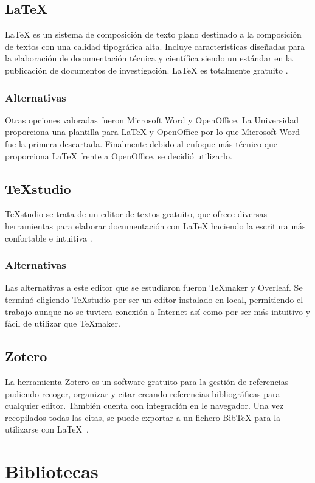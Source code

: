 	\subsection{\LaTeX}\label{LaTex}
\LaTeX{} es un sistema de composición de texto plano destinado a la composición de textos con una calidad tipográfica alta. Incluye características diseñadas para la elaboración de documentación técnica y científica siendo un estándar en la publicación de documentos de investigación. \LaTeX{} es totalmente gratuito \cite{latex}.
	\subsubsection{Alternativas}\label{AlternativasLatex}
Otras opciones valoradas fueron Microsoft Word y OpenOffice. La Universidad proporciona una plantilla para \LaTeX{} y OpenOffice por lo que Microsoft Word fue la primera descartada. Finalmente debido al enfoque más técnico que proporciona \LaTeX{} frente a OpenOffice, se decidió utilizarlo.
	\subsection{\TeX studio}\label{Texmaker}
\TeX studio{} se trata de un editor de textos gratuito, que ofrece diversas herramientas para elaborar documentación con \LaTeX{} haciendo la escritura más confortable e intuitiva \cite{texstudio}.
	\subsubsection{Alternativas}\label{AlternativasTexmaker}
Las alternativas a este editor que se estudiaron fueron \TeX maker y Overleaf. Se terminó eligiendo \TeX studio por ser un editor instalado en local, permitiendo el trabajo aunque no se tuviera conexión a Internet así como por ser más intuitivo y fácil de utilizar que \TeX maker.\\

	\subsection{Zotero}\label{zotero}
La herramienta Zotero es un software gratuito para la gestión de referencias pudiendo recoger, organizar y citar creando referencias bibliográficas para cualquier editor. También cuenta con integración en le navegador. Una vez recopilados todas las citas, se puede exportar a un fichero Bib\TeX{} para la utilizarse con \LaTeX{}~\cite{zotero}.

\section{Bibliotecas}\label{librerias}
